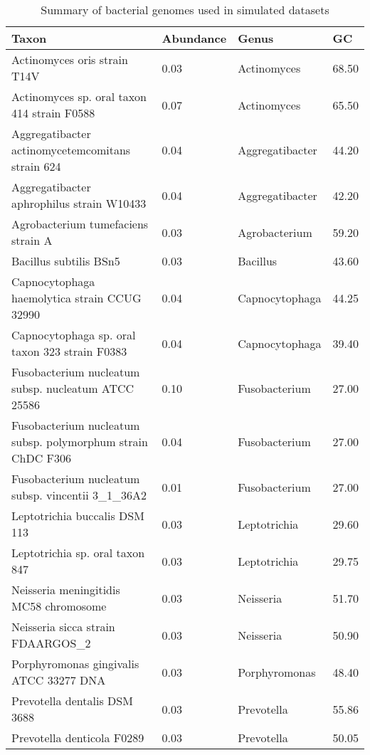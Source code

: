\documentclass[12pt, a4paper]{article}
\renewcommand{\arraystretch}{1.2}
\newcommand{\ra}[1]{\renewcommand{\arraystretch}{#1}}
\begin{document}
\begin{table}[ht]
\centering\small
\ra{1.3}
\setlength{\tabcolsep}{4pt} %
\caption{Summary of bacterial genomes used in simulated datasets}\label{table:simGenomes}
\begin{tabular}{C{7.5cm} C{2.5cm} C{3cm} C{1.5cm} }
  \hline
 \textbf{Taxon} & \textbf{Abundance} & \textbf{Genus} & \textbf{GC} \\ 
  \hline
	Actinomyces oris strain T14V & 0.03 & Actinomyces & 68.50 \\ 
	Actinomyces sp. oral taxon 414 strain F0588 & 0.07 & Actinomyces & 65.50 \\ 
	Aggregatibacter actinomycetemcomitans strain 624 & 0.04 & Aggregatibacter & 44.20 \\ 
	Aggregatibacter aphrophilus strain W10433 & 0.04 & Aggregatibacter & 42.20 \\ 
	Agrobacterium tumefaciens strain A & 0.03 & Agrobacterium & 59.20 \\ 
	Bacillus subtilis BSn5 & 0.03 & Bacillus & 43.60 \\ 
	Capnocytophaga haemolytica strain CCUG 32990 & 0.04 & Capnocytophaga & 44.25 \\ 
	Capnocytophaga sp. oral taxon 323 strain F0383 & 0.04 & Capnocytophaga & 39.40 \\ 
	Fusobacterium nucleatum subsp. nucleatum ATCC 25586 & 0.10 & Fusobacterium & 27.00 \\ 
	Fusobacterium nucleatum subsp. polymorphum strain ChDC F306 & 0.04 & Fusobacterium &  27.00 \\ 
	Fusobacterium nucleatum subsp. vincentii 3\_1\_36A2 & 0.01 & Fusobacterium & 27.00 \\ 
	Leptotrichia buccalis DSM 113 & 0.03 & Leptotrichia & 29.60 \\ 
	Leptotrichia sp. oral taxon 847 & 0.03 & Leptotrichia & 29.75 \\ 
	Neisseria meningitidis MC58 chromosome & 0.03 & Neisseria & 51.70 \\ 
	Neisseria sicca strain FDAARGOS\_2 & 0.03 & Neisseria & 50.90 \\ 
	Porphyromonas gingivalis ATCC 33277 DNA & 0.03 & Porphyromonas & 48.40 \\ 
	Prevotella dentalis DSM 3688 & 0.03 & Prevotella & 55.86 \\ 
	Prevotella denticola F0289 & 0.03 & Prevotella & 50.05 \\ 

\end{tabular}
\end{table}
\end{document}
